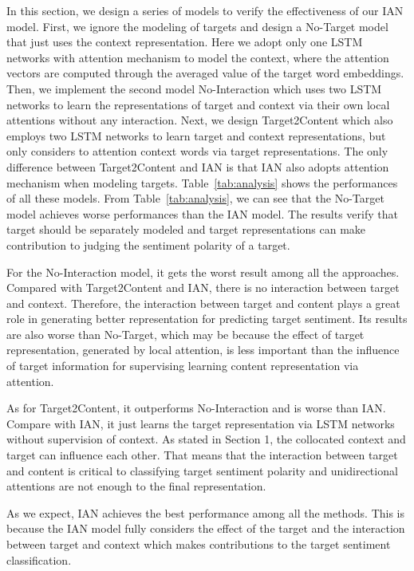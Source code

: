 \documentclass{article}
\begin{document}
In this section, we design a series of  models to verify the effectiveness of our IAN model. 
First, we ignore the modeling of targets and design a No-Target model that just uses the context representation.
Here we adopt only one LSTM networks with attention mechanism to model the context, where the attention vectors are computed through the averaged value of the target word embeddings. 
Then, we implement the second model No-Interaction which uses two LSTM networks to learn the representations of target and context via their own local attentions without any interaction.
Next, we design  Target2Content which also employs two LSTM networks to learn target and context representations, but only considers to attention context words via target representations.
The only difference between Target2Content and IAN is that IAN also adopts attention mechanism when modeling targets.
Table~\ref{tab:analysis} shows the performances of all these models.
From Table~\ref{tab:analysis}, we can see that the No-Target model achieves worse performances than the IAN model. The results verify that target  should be separately modeled and target representations can make contribution to judging the sentiment polarity of a target.

For the No-Interaction model, it gets the worst result among all the approaches. Compared with Target2Content and IAN, there is no interaction between target and context. Therefore, the interaction between target and content plays a great role in generating better representation for predicting target sentiment. Its results are also worse than No-Target, which may be because the effect of target representation, generated by local attention, is less important than the influence of target information for supervising learning content representation via attention.

As for Target2Content, it outperforms No-Interaction and is worse than IAN. Compare with IAN, it just learns the target representation via LSTM networks without supervision of context. As stated in Section 1, the collocated context and target can influence each other. 
That means that the interaction between target and content is critical to classifying target sentiment polarity and  unidirectional attentions are not enough to the final representation.

As we expect, IAN achieves the best performance among all the methods. This is because the IAN model fully considers the effect of the target and the interaction between target and context which makes contributions to the target sentiment classification.
\end{document}
